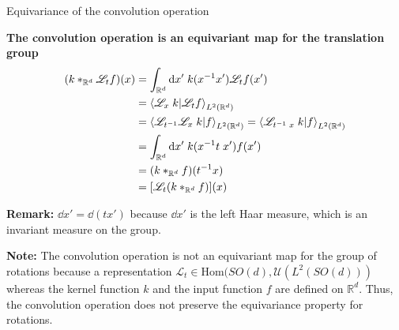 \documentclass[9pt,dvipsnames]{beamer}
\begin{document}
\begin{frame}{Equivariance of the convolution operation}
	\begin{alertblock}{\textbf{The convolution operation is an equivariant map for the translation group}}
		\begin{equation*}
			\begin{split}
				(k *_{\mathbb{R}^d} \mathscr{L}_t f)(x) & = \int_{\mathbb{R}^d} \dd x' \; k(x^{-1}x') \mathscr{L}_t f(x')                                                                            \\
				                                        & = \braket{\mathscr{L}_x \;k}{\mathscr{L}_t f}_{L^2(\mathbb{R}^d)}                                                                          \\
				                                        & = \braket{\mathscr{L}_{t^{-1}} \mathscr{L}_x \;k}{ f}_{L^2(\mathbb{R}^d)} = \braket{\mathscr{L}_{t^{-1} \; x} \;k}{ f}_{L^2(\mathbb{R}^d)} \\
				                                        & = \int_{\mathbb{R}^d} \dd x' \; k(x^{-1}t\;x') f(x')                                                                                       \\
				                                        & = (k *_{\mathbb{R}^d} f)(t^{-1}x)                                                                                                          \\
				                                        & = [\mathscr{L}_t (k *_{\mathbb{R}^d} f)](x)                                                                                                \\
			\end{split}
		\end{equation*}

		{\color{orange} {\bf Remark:} $\dd x' = \dd(t x')$ because $\dd x'$ is the left Haar measure, which is an invariant measure on the group.}
	\end{alertblock}

	\textbf{Note:} The convolution operation is not an equivariant map for the group of rotations because a representation $\mathscr{L}_t \in \mathrm{Hom}(SO(d), \mathcal{U}(L^2(SO(d)))$ whereas the kernel function $k$  and the input function $f$ are defined on $\mathbb{R}^d$. Thus, the convolution operation does not preserve the equivariance property for rotations.

\end{frame}
\end{document}
